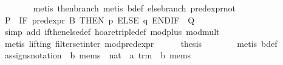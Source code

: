 \begin{isabellebody}
\ \ \ \ \ \ \isamarkupfalse%
\ {}metis\ then{}branch{}\ {}metis\ b{}def\ else{}branch\ pred{}expr{}not{}\isanewline
\ \ \ \ \isamarkupfalse%
\ {}P\ {}\ IF\ pred{}expr\ B\ THEN\ p\ ELSE\ q\ ENDIF\ {}\ Q{}\isanewline
\ \ \ \ \ \ \isamarkupfalse%
\ {}simp\ add{}\ if{}then{}else{}def\ hoare{}triple{}def\ mod{}plus\ mod{}mult{}\isanewline
\ \ \ \ \ \ \isamarkupfalse%
\ {}metis\ {}lifting{}\ filter{}set{}inter\ mod{}pred{}expr{}\isanewline
\ \ \ \ \isamarkupfalse%
\ {}thesis\isanewline
\ \ \ \ \ \ \isamarkupfalse%
\ {}metis\ b{}def{}\isanewline
\ \ \isamarkupfalse%
%
\endisatagproof
{\isafoldproof}%
%
\isadelimproof
\isanewline
%
\endisadelimproof
\isanewline
\ \ \isamarkupfalse%
\ assigns{}notation\ {}{}\ {}{}b\ mems\ {}\ nat\ {}\ {}a\ trm\ {}\ {}b\ mems{}\isanewline

\end{isabellebody}
